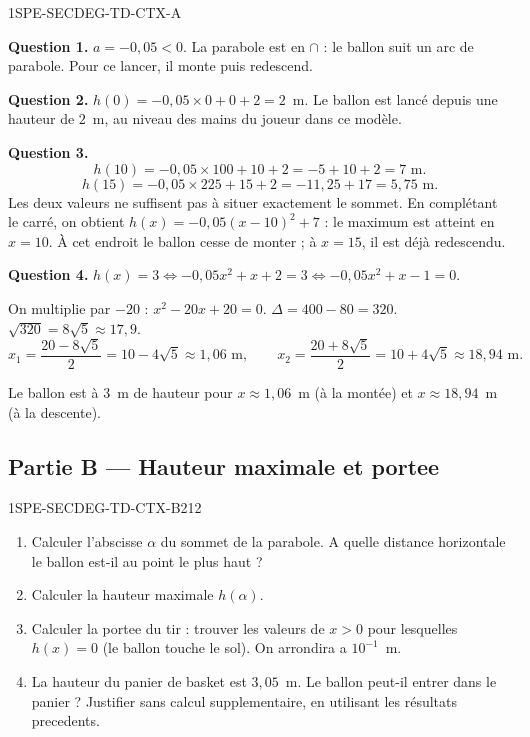 \begin{corrige}{1SPE-SECDEG-TD-CTX-A}


\textbf{Question 1.} $a = -0{,}05 < 0$. La parabole est en $\cap$ : le ballon suit
un arc de parabole. Pour ce lancer, il monte puis redescend.

\textbf{Question 2.} $h(0) = -0{,}05 \times 0 + 0 + 2 = 2$~m. Le ballon est lancé depuis une hauteur de $2$~m, au niveau des mains du joueur dans ce modèle.

\textbf{Question 3.}
\[
h(10) = -0{,}05 \times 100 + 10 + 2 = -5 + 10 + 2 = 7 \text{ m}.
\]
\[
h(15) = -0{,}05 \times 225 + 15 + 2 = -11{,}25 + 17 = 5{,}75 \text{ m}.
\]
Les deux valeurs ne suffisent pas à situer exactement le sommet. En complétant
le carré, on obtient $h(x)=-0{,}05(x-10)^2+7$ : le maximum est atteint en $x=10$.
À cet endroit le ballon cesse de monter ; à $x=15$, il est déjà redescendu.

\textbf{Question 4.} $h(x) = 3 \Leftrightarrow -0{,}05x^2 + x + 2 = 3 \Leftrightarrow -0{,}05x^2 + x - 1 = 0$.

On multiplie par $-20$ : $x^2 - 20x + 20 = 0$.
$\Delta = 400 - 80 = 320$. $\sqrt{320} = 8\sqrt{5} \approx 17{,}9$.
\[
x_1 = \frac{20-8\sqrt{5}}{2}=10-4\sqrt{5}\approx1{,}06 \text{ m},
\qquad x_2=\frac{20+8\sqrt{5}}{2}=10+4\sqrt{5}\approx18{,}94 \text{ m}.
\]

Le ballon est à $3$~m de hauteur pour $x \approx 1{,}06$~m (à la montée) et $x \approx 18{,}94$~m (à la descente).

\end{corrige}

\bigskip

\subsection*{Partie B — Hauteur maximale et portee}

\begin{exercice}{1SPE-SECDEG-TD-CTX-B}{2}{12}
\begin{enumerate}
  \item Calculer l'abscisse $\alpha$ du sommet de la parabole.
    A quelle distance horizontale le ballon est-il au point le plus haut ?
  \item Calculer la hauteur maximale $h(\alpha)$.
  \item Calculer la portee du tir : trouver les valeurs de $x > 0$ pour lesquelles $h(x) = 0$
    (le ballon touche le sol). On arrondira a $10^{-1}$~m.
  \item La hauteur du panier de basket est $3{,}05$~m. Le ballon peut-il entrer dans le panier ?
    Justifier sans calcul supplementaire, en utilisant les résultats precedents.
\end{enumerate}
\end{exercice}

